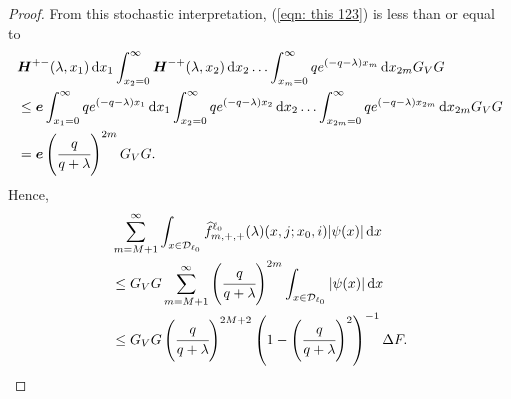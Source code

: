 \begin{proof}
        From this stochastic interpretation, (\ref{eqn: this 123}) is less than or equal to 
        \begin{align}
		&\boldsymbol H^{+-}(\lambda,x_1) \, \mathrm{d} x_1 \int_{x_2=0}^\infty \boldsymbol H^{-+}(\lambda,x_2)  \, \mathrm{d} x_2  
                	\hdots \int_{x_m=0}^\infty qe^{(-q-\lambda)x_m}\, \mathrm{d} x_{2m}G_VG \nonumber
		\\&\leq \boldsymbol e\int_{x_1=0}^\infty qe^{(-q-\lambda)x_1}  \, \mathrm{d} x_1 \int_{x_2=0}^\infty qe^{(-q-\lambda)x_2}  \, \mathrm{d} x_2  
                	\hdots \int_{x_{2m}=0}^\infty qe^{(-q-\lambda)x_{2m}}\, \mathrm{d} x_{2m}G_VG \nonumber
		\\&= \boldsymbol e\left(\cfrac{q}{q+\lambda}\right)^{2m}G_VG.\label{eqn: bound ggggaaaa}
        \end{align}
        Hence,  
        \begin{align}
	         &\sum_{m=M+1}^\infty \int_{x\in\mathcal{D}_{\ell_0}} \widehat f^{\ell_0}_{m,+,+}(\lambda)(x,j;x_0,i)|\psi(x)|\, \mathrm{d} x \nonumber
	        \\&\leq  {G_V}G  \sum_{m=M+1}^\infty \left(\cfrac{q}{q+\lambda}\right)^{2m}\int_{x\in\mathcal{D}_{\ell_0}} |\psi(x)|\, \mathrm{d} x \nonumber
	        \\&\leq {G_V}G \left(\cfrac{q}{q+\lambda}\right)^{2M+2} \left(1-\left(\cfrac{q}{q+\lambda}\right)^2\right)^{-1} \Delta F.
        \end{align}
        

\end{proof}
